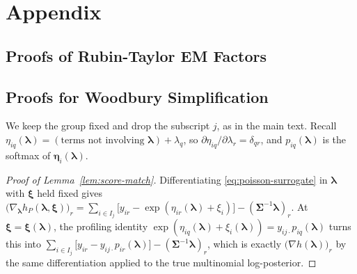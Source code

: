 \appendix

\chapter{Appendix}

\section{Proofs of Rubin-Taylor EM Factors}


\section{Proofs for Woodbury Simplification}
\label{app:woodbury-proofs}

We keep the group fixed and drop the subscript $j$, as in the main text. Recall $\eta_{iq}(\bm{\lambda})=(\text{terms not involving }\bm{\lambda})+\lambda_{q}$, so $\partial\eta_{iq}/\partial\lambda_{r}=\delta_{qr}$, and $p_{iq}(\bm{\lambda})$ is the softmax of $\bm{\eta}_{i}(\bm{\lambda})$.

\begin{proof}[Proof of Lemma~\ref{lem:score-match}]
Differentiating \eqref{eq:poisson-surrogate} in $\bm{\lambda}$ with $\bm{\xi}$ held fixed gives $\big(\nabla_{\bm{\lambda}}h_{P}(\bm{\lambda},\bm{\xi})\big)_{r}=\sum_{i\in I_{j}}\big[y_{ir}-\exp(\eta_{ir}(\bm{\lambda})+\xi_{i})\big]-(\bm{\Sigma}^{-1}\bm{\lambda})_{r}$. At $\bm{\xi}=\bm{\xi}(\bm{\lambda})$, the profiling identity $\exp(\eta_{iq}(\bm{\lambda})+\xi_{i}(\bm{\lambda}))=y_{ij\cdot}p_{iq}(\bm{\lambda})$ turns this into $\sum_{i\in I_{j}}\big[y_{ir}-y_{ij\cdot}p_{ir}(\bm{\lambda})\big]-(\bm{\Sigma}^{-1}\bm{\lambda})_{r}$, which is exactly $\big(\nabla h(\bm{\lambda})\big)_{r}$ by the same differentiation applied to the true multinomial log-posterior.
\end{proof}

